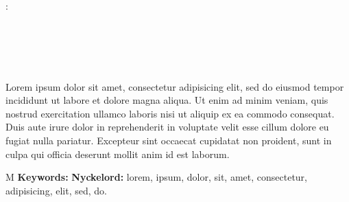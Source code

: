 \thesisImprintTitle:\\
\thesisImprintSubtitle\\[1ex]
\thesisAuthor\\
\thesisDepartment\\
\thesisUniversity

\thispagestyle{plain}           %
\section*{\abstractname}
Lorem ipsum dolor sit amet, consectetur adipisicing elit, sed do eiusmod tempor incididunt ut labore et dolore magna aliqua. Ut enim ad minim veniam, quis nostrud exercitation ullamco laboris nisi ut aliquip ex ea commodo consequat. Duis aute irure dolor in reprehenderit in voluptate velit esse cillum dolore eu fugiat nulla pariatur. Excepteur sint occaecat cupidatat non proident, sunt in culpa qui officia deserunt mollit anim id est laborum.


\if\thesisType M
    \textbf{Keywords:}
\else
    \textbf{Nyckelord:}
\fi
lorem, ipsum, dolor, sit, amet, consectetur, adipisicing, elit, sed, do.

\if{}
\newpage                %
\thispagestyle{empty}
\mbox{}
\fi

